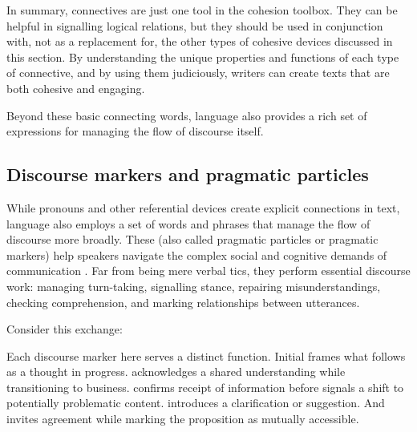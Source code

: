In summary, connectives are just one tool in the cohesion toolbox. They can be helpful in signalling logical relations, but they should be used in conjunction with, not as a replacement for, the other types of cohesive devices discussed in this section. By understanding the unique properties and functions of each type of connective, and by using them judiciously, writers can create texts that are both cohesive and engaging.

Beyond these basic connecting words, language also provides a rich set of expressions for managing the flow of discourse itself.

\subsection{Discourse markers and pragmatic particles}\label{sec:discourse-markers}

While pronouns and other referential devices create explicit connections in text, language also employs a set of words and phrases that manage the flow of discourse more broadly. These  (also called pragmatic particles or pragmatic markers) help speakers navigate the complex social and cognitive demands of communication \citep{Schiffrin1987}. Far from being mere verbal tics, they perform essential discourse work: managing turn-taking, signalling stance, repairing misunderstandings, checking comprehension, and marking relationships between utterances.

Consider this exchange:

\begin{dialogue}
\item[A] 
\item[B] 
\item[A] 
\item[B] 
\item[A] 
\end{dialogue}

Each discourse marker here serves a distinct function. Initial  frames what follows as a thought in progress.  acknowledges a shared understanding while transitioning to business.  confirms receipt of information before  signals a shift to potentially problematic content.  introduces a clarification or suggestion. And  invites agreement while marking the proposition as mutually accessible.

